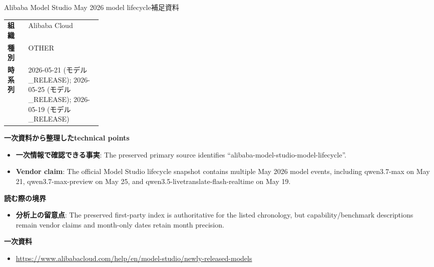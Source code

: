 \begin{technicalnote}{Alibaba Model Studio May 2026 model lifecycle}{補足資料}
\begin{tabularx}{\linewidth}{@{}>{\bfseries}p{0.22\linewidth}X@{}}
組織 & Alibaba Cloud \\
種別 & OTHER \\
時系列 & 2026-05-21 (モデル\_RELEASE); 2026-05-25 (モデル\_RELEASE); 2026-05-19 (モデル\_RELEASE) \\
\end{tabularx}
\smallskip
{\bfseries 一次資料から整理したtechnical points}
\begin{itemize}[leftmargin=1.5em,itemsep=0.35em]
\item \textbf{一次情報で確認できる事実}: The preserved primary source identifies “alibaba-model-studio-model-lifecycle”.
\item \textbf{Vendor claim}: The official Model Studio lifecycle snapshot contains multiple May 2026 model events, including qwen3.7-max on May 21, qwen3.7-max-preview on May 25, and qwen3.5-livetranslate-flash-realtime on May 19.
\end{itemize}
{\bfseries 読む際の境界}
\begin{itemize}[leftmargin=1.5em,itemsep=0.35em]
\item \textbf{分析上の留意点}: The preserved first-party index is authoritative for the listed chronology, but capability/benchmark descriptions remain vendor claims and month-only dates retain month precision.
\end{itemize}
{\bfseries 一次資料}
\begingroup\sloppy
\begin{itemize}[leftmargin=1.5em,itemsep=0.25em]
\item {\scriptsize\url{https://www.alibabacloud.com/help/en/model-studio/newly-released-models}}
\end{itemize}
\endgroup
\end{technicalnote}
\medskip

